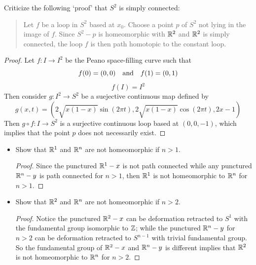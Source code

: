 \documentclass[12pt,a4paper]{article}
\begin{document}
    \begin{ex}
        Criticize the following `proof' that $S^2$ is simply connected:
        \begin{quote}
            Let $f$ be a loop in $S^2$ based at $x_0$. Choose a point $p$ of $S^2$ not lying in the image of $f$. Since $S^2-p$ is homeomorphic with $\mathbb{R}^2$ and $\mathbb{R}^2$ is simply connected, the loop $f$ is then path homotopic to the constant loop.
        \end{quote}
    \end{ex}
    \begin{proof}
        Let $f:I\to I^2$ be the Peano space-filling curve such that
        \[
            f(0)=(0,0)\quad\text{and}\quad f(1)=(0,1)
        \]
        \[
            f(I)=I^2
        \]
        Then consider $g:I^2\to S^2$ be a suejective continuous map defined by
        \[
            g(x,t)=(2\sqrt{x(1-x)}\sin (2\pi t),2\sqrt{x(1-x)}\cos (2\pi t),2x-1)
        \]
        Then $g\circ f:I\to S^2$ is a surjective continuous loop based at $(0,0,-1)$, which implies that the point $p$ does not necessarily exist.
    \end{proof}

    \begin{ex}
        \begin{itemize}
            \item Show that $\mathbb{R}^1$ and $\mathbb{R}^n$ are not homeomorphic if $n>1$.
            \begin{proof}
                Since the punctured $\mathbb{R}^1-x$ is not path connected while any punctured $\mathbb{R}^n-y$ is path connected for $n>1$, then $\mathbb{R}^1$ is not homeomorphic to $\mathbb{R}^n$ for $n>1$.
            \end{proof}
            \item Show that $\mathbb{R}^2$ and $\mathbb{R}^n$ are not homeomorphic if $n>2$.
            \begin{proof}
                Notice the punctured $\mathbb{R}^2-x$ can be deformation retracted to $S^1$ with the fundamental group isomorphic to $\mathbb{Z}$; while the punctured $\mathbb{R}^n-y$ for $n>2$ can be deformation retracted to $S^{n-1}$ with trivial fundamental group. So the fundamental group of $\mathbb{R}^2-x$ and $\mathbb{R}^n-y$ is different implies that $\mathbb{R}^2$ is not homeomorphic to $\mathbb{R}^n$ for $n>2$.
            \end{proof}
        \end{itemize}
    \end{ex}
    \bigskip
\end{document}
